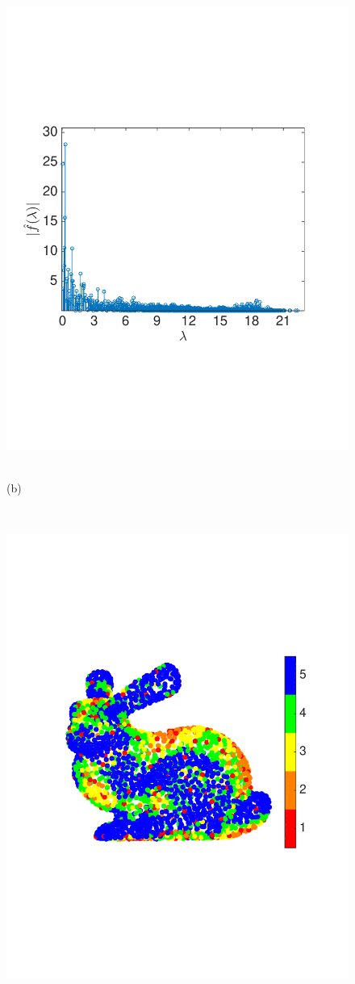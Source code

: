 \documentclass[journal, 10pt]{IEEEtran}
\begin{document}
\begin{figure}[tbh]
\begin{minipage}[m]{0.48\linewidth}
\centerline{\includegraphics[width=.8\linewidth]{fig_bunny_signal_hat}~~~~~~~}
\centerline{\small{(b)}}
\end{minipage} \\
\begin{minipage}[m]{0.48\linewidth}
\centerline{\includegraphics[width=.8\linewidth]{fig_bunny_partition}}

\end{minipage}
\end{figure}
\end{document}
